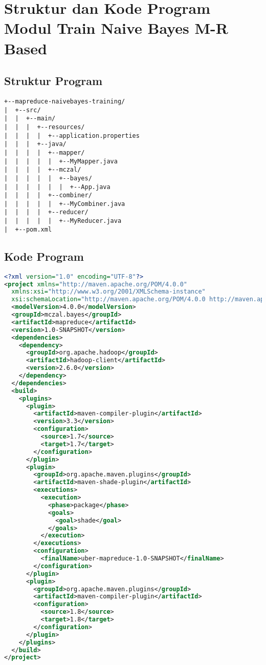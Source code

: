 \chapter{Struktur dan Kode Program Modul Train Naive Bayes M-R Based}
\label{lamp:A}
\section{Struktur Program}
\begin{lstlisting}
+--mapreduce-naivebayes-training/
|  +--src/
|  |  +--main/
|  |  |  +--resources/
|  |  |  |  +--application.properties
|  |  |  +--java/
|  |  |  |  +--mapper/
|  |  |  |  |  +--MyMapper.java
|  |  |  |  +--mczal/
|  |  |  |  |  +--bayes/
|  |  |  |  |  |  +--App.java
|  |  |  |  +--combiner/
|  |  |  |  |  +--MyCombiner.java
|  |  |  |  +--reducer/
|  |  |  |  |  +--MyReducer.java
|  +--pom.xml
\end{lstlisting}

\section{Kode Program}
\singlespacing 
%
%
\begin{lstlisting}[language=xml,basicstyle=\tiny,caption=pom.xml]
<?xml version="1.0" encoding="UTF-8"?>
<project xmlns="http://maven.apache.org/POM/4.0.0"
  xmlns:xsi="http://www.w3.org/2001/XMLSchema-instance"
  xsi:schemaLocation="http://maven.apache.org/POM/4.0.0 http://maven.apache.org/xsd/maven-4.0.0.xsd">
  <modelVersion>4.0.0</modelVersion>
  <groupId>mczal.bayes</groupId>
  <artifactId>mapreduce</artifactId>
  <version>1.0-SNAPSHOT</version>
  <dependencies>
    <dependency>
      <groupId>org.apache.hadoop</groupId>
      <artifactId>hadoop-client</artifactId>
      <version>2.6.0</version>
    </dependency>
  </dependencies>
  <build>
    <plugins>
      <plugin>
        <artifactId>maven-compiler-plugin</artifactId>
        <version>3.3</version>
        <configuration>
          <source>1.7</source>
          <target>1.7</target>
        </configuration>
      </plugin>
      <plugin>
        <groupId>org.apache.maven.plugins</groupId>
        <artifactId>maven-shade-plugin</artifactId>
        <executions>
          <execution>
            <phase>package</phase>
            <goals>
              <goal>shade</goal>
            </goals>
          </execution>
        </executions>
        <configuration>
          <finalName>uber-mapreduce-1.0-SNAPSHOT</finalName>
        </configuration>
      </plugin>
      <plugin>
        <groupId>org.apache.maven.plugins</groupId>
        <artifactId>maven-compiler-plugin</artifactId>
        <configuration>
          <source>1.8</source>
          <target>1.8</target>
        </configuration>
      </plugin>
    </plugins>
  </build>
</project>
\end{lstlisting}


